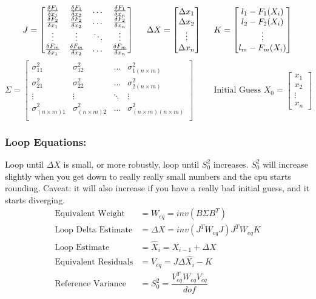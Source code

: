 \[
J = \begin{bmatrix}
\frac{\delta F_1}{\delta x_1} & \frac{\delta F_1}{\delta x_2} & \dots & \frac{\delta F_1}{\delta x_n} \\
\frac{\delta F_2}{\delta x_1} & \frac{\delta F_2}{\delta x_2} & \dots & \frac{\delta F_2}{\delta x_n} \\
\vdots & \vdots & \ddots& \vdots \\
\frac{\delta F_m}{\delta x_1} & \frac{\delta F_m}{\delta x_2} & \dots & \frac{\delta F_m}{\delta x_n} \\
\end{bmatrix}
\hspace{0.5cm}
\Delta X = 
\begin{bmatrix}
\Delta x_1 \\ \Delta x_2 \\ \vdots \\ \Delta x_n
\end{bmatrix}
\hspace{0.5cm}
K = 
\begin{bmatrix}
l_1 - F_1(X_i) \\ l_2 - F_2(X_i)\\ \vdots \\ l_m - F_m(X_i)
\end{bmatrix}
\]
\[
\Sigma = 
\begin{bmatrix}
\sigma_{11}^2 & \sigma_{12}^2 & \dots & \sigma_{1(n\times m)}^2 \\ 
\sigma_{21}^2 & \sigma_{22}^2 & \dots & \sigma_{2(n\times m)}^2 \\ 
\vdots & \vdots & \ddots& \vdots \\
\sigma_{(n\times m)1}^2 & \sigma_{(n\times m)2}^2 & \dots & \sigma_{(n\times m)(n\times m)}^2 \\ 
\end{bmatrix}
\hspace{1cm}
\text{Initial Guess } X_0 = 
\begin{bmatrix}
x_1 \\ x_2 \\ \vdots \\ x_n
\end{bmatrix}
\]
\subsubsection{Loop Equations:}
Loop until $\Delta X $ is small, or more robustly, loop until $S_0^2$ increases.  $S_0^2$ will increase slightly when you get down to really really small numbers and the cpu starts rounding.  Caveat: it will also increase if you have a really bad initial guess, and it starts diverging.
\vspace{0.15cm}
\begin{align*}
	\text{Equivalent Weight} &=  W_{eq} = inv(B\Sigma B^T) \\
	\text{Loop Delta Estimate} &= \Delta X = inv(J^TW_{eq}J)J^TW_{eq}K \\
	\text{Loop Estimate} &=  \hat{X}_i = X_{i-1}+\Delta X \\
	\text{Equivalent Residuals} &= V_{eq} = J\Delta \hat{X_i} - K \\
	\text{Reference Variance} &= S_0^2 = \dfrac{V_{eq}^TW_{eq}V_{eq}}{dof}
\end{align*}

